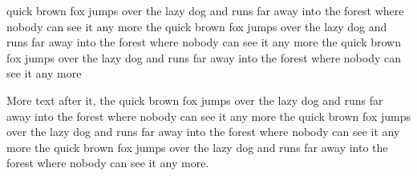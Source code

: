 \documentclass{article}
\begin{document}
quick brown fox jumps over the lazy dog and runs far away into the forest where nobody can see it any more the quick brown fox jumps over the lazy dog and runs far away into the forest where nobody can see it any more the quick brown fox jumps over the lazy dog and runs far away into the forest where nobody can see it any more

More text after it, the quick brown fox jumps over the lazy dog and runs far away into the forest where nobody can see it any more the quick brown fox jumps over the lazy dog and runs far away into the forest where nobody can see it any more the quick brown fox jumps over the lazy dog and runs far away into the forest where nobody can see it any more.
\end{document}
